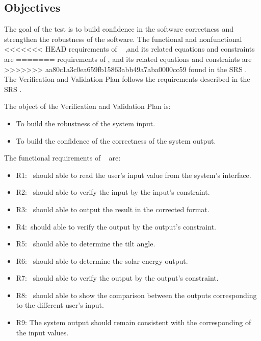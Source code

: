 \documentclass[12pt, titlepage]{article}
\begin{document}
\subsection{Objectives}\label{Objectives}

The goal of the test is to build confidence in the software correctness and
strengthen the robustness of the software. The functional and nonfunctional
<<<<<<< HEAD
requirements of \progname~ ,and its related equations and constraints are
=======
requirements of \progname, and its related equations and constraints are 
>>>>>>> aa80c1a3c0ea659fb15863abb49a7aba0000cc59
found in the SRS \cite{YS2019}. The Verification and Validation Plan follows
the requirements described in the SRS \cite{YS2019}.

The object of the Verification and Validation Plan is:
\noindent \begin{itemize}

\item[ ] To build the robustness of the system input.
\item[ ] To build the confidence of the correctness of the system output.

\noindent \end{itemize}


The functional requirements of  \progname~ are:
\noindent \begin{itemize}

\item[ ]R1: \progname~should able to read the user's input value from the
system's interface.

\item[ ]R2: \progname~should able to verify the input by the input's constraint.

\item[ ]R3: \progname~should able to output the result in
the corrected format.

\item[ ]R4:\progname~should able to verify the output by the output's constraint.

\item[ ]R5: \progname~should able to determine the tilt angle.

\item[ ]R6: \progname~should able to determine the solar energy output.

\item[ ]R7: \progname~should able to verify the output by the output's constraint. 

\item[ ]R8: \progname~should able to show the comparison
between the outputs corresponding to the different user's input.


\item[ ]R9: The system output should remain consistent with
the corresponding of the input values.

\end{itemize}
\end{document}
